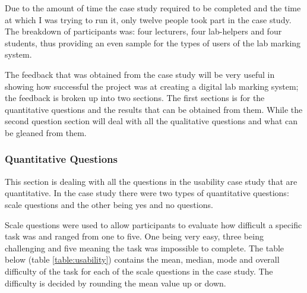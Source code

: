 \documentclass[12pt]{article}  %
\begin{document}
Due to the amount of time the case study required to be completed and the time at which I was trying to run it, only twelve people took part in the case study. The breakdown of participants was: four lecturers, four lab-helpers and four students, thus providing an even sample for the types of users of the lab marking system.

The feedback that was obtained from the case study will be very useful in showing how successful the project was at creating a digital lab marking system; the feedback is broken up into two sections. The first sections is for the quantitative questions and the results that can be obtained from them. While the second question section will deal with all the qualitative questions and what can be gleaned from them. 



\subsubsection{Quantitative Questions}

This section is dealing with all the questions in the usability case study that are quantitative. In the case study there were two types of quantitative questions: scale questions and the other being  yes and no questions.

Scale questions were used to allow participants to evaluate how difficult a specific task was and ranged from one to five. One being very easy, three being challenging and five meaning the task was impossible to complete. 
The table below (table \ref{table:usability}) contains the mean, median, mode and overall difficulty of the task for each of the scale questions in the case study. The difficulty is decided by rounding the mean value up or down.

\setlength\LTleft{0pt}
\setlength\LTright{0pt}
\end{document}
